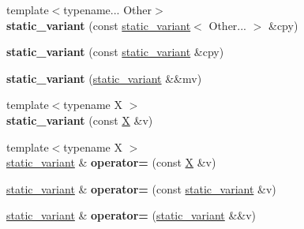 \begin{DoxyCompactItemize}
\item 
\mbox{\label{classfc_1_1static__variant_a2b4e0ec9f3fa4383f9030e92281388ff}} 
{\footnotesize template$<$typename... Other$>$ }\\{\bfseries static\+\_\+variant} (const \mbox{\hyperlink{classfc_1_1static__variant}{static\+\_\+variant}}$<$ Other... $>$ \&cpy)
\item 
\mbox{\label{classfc_1_1static__variant_ad8841f15bfeead64a55d4cb01a6d93bc}} 
{\bfseries static\+\_\+variant} (const \mbox{\hyperlink{classfc_1_1static__variant}{static\+\_\+variant}} \&cpy)
\item 
\mbox{\label{classfc_1_1static__variant_a163c0efde242bed98389f8e47a95284c}} 
{\bfseries static\+\_\+variant} (\mbox{\hyperlink{classfc_1_1static__variant}{static\+\_\+variant}} \&\&mv)
\item 
\mbox{\label{classfc_1_1static__variant_ae9febf4b8197ad7ee288917ddfda65ad}} 
{\footnotesize template$<$typename X $>$ }\\{\bfseries static\+\_\+variant} (const \mbox{\hyperlink{class_x}{X}} \&v)
\item 
\mbox{\label{classfc_1_1static__variant_ac6d6e9317b7ae185c99da3ae0ec18556}} 
{\footnotesize template$<$typename X $>$ }\\\mbox{\hyperlink{classfc_1_1static__variant}{static\+\_\+variant}} \& {\bfseries operator=} (const \mbox{\hyperlink{class_x}{X}} \&v)
\item 
\mbox{\label{classfc_1_1static__variant_aba7bff21c84651e5c173e83970e89068}} 
\mbox{\hyperlink{classfc_1_1static__variant}{static\+\_\+variant}} \& {\bfseries operator=} (const \mbox{\hyperlink{classfc_1_1static__variant}{static\+\_\+variant}} \&v)
\item 
\mbox{\label{classfc_1_1static__variant_abd8fecdd03a65f1045cdac2875eddd88}} 
\mbox{\hyperlink{classfc_1_1static__variant}{static\+\_\+variant}} \& {\bfseries operator=} (\mbox{\hyperlink{classfc_1_1static__variant}{static\+\_\+variant}} \&\&v)

\end{DoxyCompactItemize}
